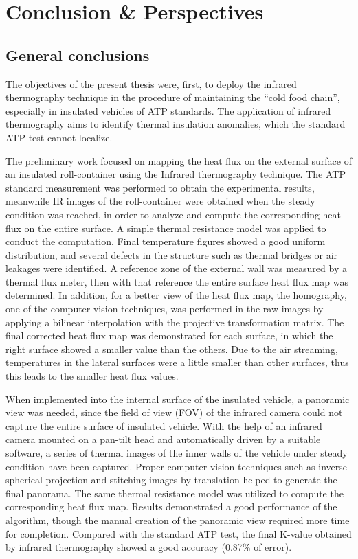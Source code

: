 \chapter{Conclusion \& Perspectives}         %

\section{General conclusions}
The objectives of the present thesis were, first, to deploy the infrared thermography technique in the procedure of maintaining the ``cold food chain'', especially in insulated vehicles of ATP standards. The application of infrared thermography aims to identify thermal insulation anomalies, which the standard ATP test cannot localize. 

The preliminary work focused on mapping the heat flux on the external surface of an insulated roll-container using the Infrared thermography technique. The ATP standard measurement was performed to obtain the experimental results, meanwhile IR images of the roll-container were obtained when the steady condition was reached, in order to analyze and compute the corresponding heat flux on the entire surface. A simple thermal resistance model was applied to conduct the computation. Final temperature figures showed a good uniform distribution, and several defects in the structure such as thermal bridges or air leakages were identified. A reference zone of the external wall was measured by a thermal flux meter, then with that reference the entire surface heat flux map was determined. In addition, for a better view of the heat flux map, the homography, one of the computer vision techniques, was performed in the raw images by applying a bilinear interpolation with the projective transformation matrix. The final corrected heat flux map was demonstrated for each surface, in which the right surface showed a smaller value than the others.  Due to the air streaming, temperatures in the lateral surfaces were a little smaller than other surfaces, thus this leads to the smaller heat flux values.

When implemented into the internal surface of the insulated vehicle, a panoramic view was needed, since the field of view (FOV) of the infrared camera could not capture the entire surface of insulated vehicle. With the help of an infrared camera mounted on a pan-tilt head and automatically driven by a suitable software, a series of thermal images of the inner walls of the vehicle under steady condition have been captured. Proper computer vision techniques such as inverse spherical projection and stitching images by translation helped to generate the final panorama. The same thermal resistance model was utilized to compute the corresponding heat flux map. Results demonstrated a good performance of the algorithm, though the manual creation of the panoramic view required more time for completion. Compared with the standard ATP test, the final K-value obtained by infrared thermography showed a good accuracy (0.87\% of error).

